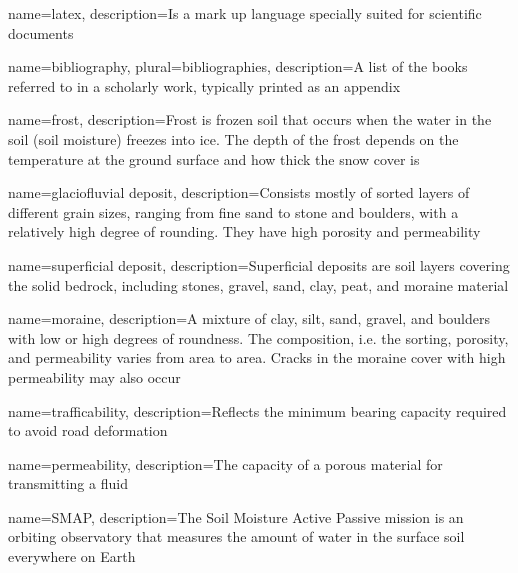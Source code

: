 

\makeglossaries %


{
        name=latex,
        description={Is a mark up language specially suited for
scientific documents}
}

{
        name=bibliography,
        plural=bibliographies,
        description={A list of the books referred to in a scholarly work,
typically printed as an appendix}
}

{
    name=frost,
    description={Frost is frozen soil that occurs when the water in the soil (soil moisture) freezes into ice. The depth of the frost depends on the temperature at the ground surface and how thick the snow cover is \cite{senorge_terminology}}
}

{
    name=glaciofluvial deposit,
    description={Consists mostly of sorted layers of different grain sizes, ranging from fine sand to stone and boulders, with a relatively high degree of rounding. They have high porosity and permeability \cite{ngu_deposits}}
}

{
    name=superficial deposit,
    description={Superficial deposits are soil layers covering the solid bedrock, including stones, gravel, sand, clay, peat, and moraine material \cite{snl_losmasser}}
}

{
    name=moraine,
    description={A mixture of clay, silt, sand, gravel, and boulders with low or high degrees of roundness. The composition, i.e. the sorting, porosity, and permeability varies from area to area. Cracks in the moraine cover with high permeability may also occur \cite{ngu_deposits}}
}

{
    name=trafficability,
    description={Reflects the minimum bearing capacity required to avoid road deformation}
}

{
    name=permeability,
    description={The capacity of a porous material for transmitting a fluid \cite{britannica_permeability}}
}

{
    name=SMAP,
    description={The Soil Moisture Active Passive mission is an orbiting observatory that measures the amount of water in the surface soil everywhere on Earth \cite{nasaSMAP}}
}

